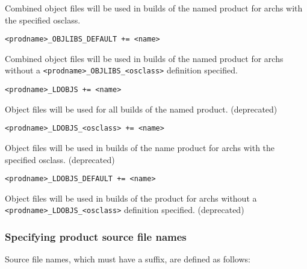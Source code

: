 \begin{description}
Combined object files will be used in builds of the named product for archs with the specified osclass.

\item \verb|<prodname>_OBJLIBS_DEFAULT += <name>|

Combined object files will be used in builds of the named product for archs without a 
\verb|<prodname>_OBJLIBS_<osclass>| definition specified.



\item {}\verb|<prodname>_LDOBJS += <name>|

Object files will be used for all builds of the named product. (deprecated)

\item \verb|<prodname>_LDOBJS_<osclass> += <name>| 

Object files will be used in builds of the name product for archs with the specified osclass. (deprecated)

\item \verb|<prodname>_LDOBJS_DEFAULT += <name>|

Object files will be used in builds of the product for archs without a \verb|<prodname>_LDOBJS_<osclass>| 
definition specified. (deprecated)

\end{description}

\subsubsection{Specifying product source file names}

Source file names, which must have a suffix, are defined as follows:


